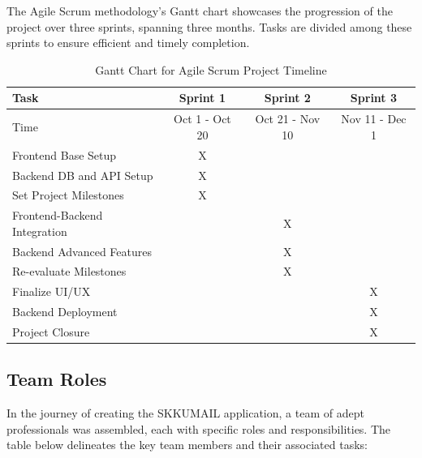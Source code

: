 The Agile Scrum methodology's Gantt chart showcases the progression of the project over three sprints, spanning three months. Tasks are divided among these sprints to ensure efficient and timely completion.

\begin{table}[ht]
	\centering
	\begin{tabularx}{\textwidth}{|X|c|c|c|}
		\hline
		\rowcolor{gray!30}
		Task                         & Sprint 1       & Sprint 2        & Sprint 3       \\
		\hline
		\rowcolor{gray!30}
				
		Time                         & Oct 1 - Oct 20 & Oct 21 - Nov 10 & Nov 11 - Dec 1 \\
		\hline
		Frontend Base Setup          & X              &                 &                \\
		\hline
		Backend DB and API Setup     & X              &                 &                \\
		\hline
		Set Project Milestones       & X              &                 &                \\
		\hline
		Frontend-Backend Integration &                & X               &                \\
		\hline
		Backend Advanced Features    &                & X               &                \\
		\hline
		Re-evaluate Milestones       &                & X               &                \\
		\hline
		Finalize UI/UX               &                &                 & X              \\
		\hline
		Backend Deployment           &                &                 & X              \\
		\hline
		Project Closure              &                &                 & X              \\
		\hline
	\end{tabularx}
	\caption{Gantt Chart for Agile Scrum Project Timeline}
\end{table}

\subsection{Team Roles}

In the journey of creating the SKKUMAIL application, a team of adept professionals was assembled, each with specific roles and responsibilities. The table below delineates the key team members and their associated tasks:


